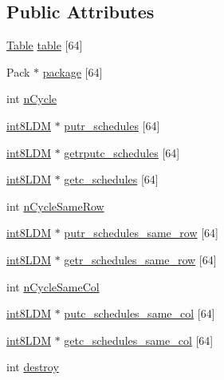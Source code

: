 \subsection*{Public Attributes}
\begin{DoxyCompactItemize}
\item 
\mbox{\hyperlink{structTable}{Table}} \mbox{\hyperlink{structSchedule_ae259737ec627f66a8f4a81877520983c}{table}} \mbox{[}64\mbox{]}
\item 
Pack $\ast$ \mbox{\hyperlink{structSchedule_a6fe3064eff8f8304a00c695fc87fba8e}{package}} \mbox{[}64\mbox{]}
\item 
int \mbox{\hyperlink{structSchedule_aedc1bdf1c4fa45250d2b13d7aae41ed4}{n\+Cycle}}
\item 
\mbox{\hyperlink{include_2RlmpiShared_8h_a69782ffde89d45e86308f10afedf08a6}{int8\+L\+DM}} $\ast$ \mbox{\hyperlink{structSchedule_aa0610471756372c5b0c37a97f9cce156}{putr\+\_\+schedules}} \mbox{[}64\mbox{]}
\item 
\mbox{\hyperlink{include_2RlmpiShared_8h_a69782ffde89d45e86308f10afedf08a6}{int8\+L\+DM}} $\ast$ \mbox{\hyperlink{structSchedule_a7e8bf02cb2c858ea3a6d331541027d72}{getrputc\+\_\+schedules}} \mbox{[}64\mbox{]}
\item 
\mbox{\hyperlink{include_2RlmpiShared_8h_a69782ffde89d45e86308f10afedf08a6}{int8\+L\+DM}} $\ast$ \mbox{\hyperlink{structSchedule_a0c0f6a13e68b492a0e4c390b39ad85ef}{getc\+\_\+schedules}} \mbox{[}64\mbox{]}
\item 
int \mbox{\hyperlink{structSchedule_aafb49c4ddb736e61cd99381077a2122a}{n\+Cycle\+Same\+Row}}
\item 
\mbox{\hyperlink{include_2RlmpiShared_8h_a69782ffde89d45e86308f10afedf08a6}{int8\+L\+DM}} $\ast$ \mbox{\hyperlink{structSchedule_a56d343a3f678f6235ba9c7553afbf3ba}{putr\+\_\+schedules\+\_\+same\+\_\+row}} \mbox{[}64\mbox{]}
\item 
\mbox{\hyperlink{include_2RlmpiShared_8h_a69782ffde89d45e86308f10afedf08a6}{int8\+L\+DM}} $\ast$ \mbox{\hyperlink{structSchedule_a3f921de672d96641c60fc9f06e590ddb}{getr\+\_\+schedules\+\_\+same\+\_\+row}} \mbox{[}64\mbox{]}
\item 
int \mbox{\hyperlink{structSchedule_ab887894faf2b9bed0934452e1c2bf667}{n\+Cycle\+Same\+Col}}
\item 
\mbox{\hyperlink{include_2RlmpiShared_8h_a69782ffde89d45e86308f10afedf08a6}{int8\+L\+DM}} $\ast$ \mbox{\hyperlink{structSchedule_a3944a11a393685264fdd5b2067ed5950}{putc\+\_\+schedules\+\_\+same\+\_\+col}} \mbox{[}64\mbox{]}
\item 
\mbox{\hyperlink{include_2RlmpiShared_8h_a69782ffde89d45e86308f10afedf08a6}{int8\+L\+DM}} $\ast$ \mbox{\hyperlink{structSchedule_a746c407eb32c955a013013b47b5b3277}{getc\+\_\+schedules\+\_\+same\+\_\+col}} \mbox{[}64\mbox{]}
\item 
int \mbox{\hyperlink{structSchedule_ab2823b4aae65c91dc839a8ac5e221fe2}{destroy}}
\end{DoxyCompactItemize}


